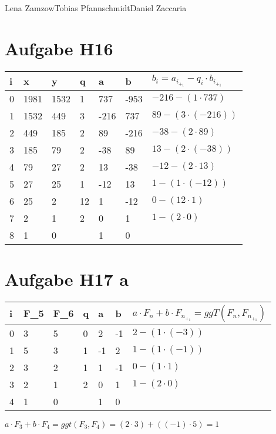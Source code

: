 \documentclass[11pt,a4paper]{article}
\begin{document}
                {Lena Zamzow}{Tobias Pfannschmidt}{Daniel Zaccaria}{}{}


\section*{Aufgabe H16}

\begin{center}
	\begin{tabular}{ | l | l | l | l | l | l | l|}
		\hline
		i&x&y&q&a&b&$b_i=a_i_+_1-q_i \cdot b_i_+_1 $ \\ \hline		
		0&1981&1532&1&737&-953&$-216-(1 \cdot 737 )$ \\ \hline
		1&1532&449&3&-216&737&$89-(3 \cdot (-216) )$ \\ \hline
		2&449&185&2&89&-216&$-38-(2 \cdot 89)$\\ \hline
		3&185&79&2&-38&89&$13-(2 \cdot (-38))$ \\ \hline
		4&79&27&2&13&-38&$-12-(2 \cdot 13)$ \\ \hline
		5&27&25&1&-12&13&$1-(1\cdot (-12))$ \\ \hline
		6&25&2&12&1&-12&$0-(12 \cdot 1)$\\ \hline
		7&2&1&2&0&1&$1-(2 \cdot 0)$\\ \hline
		8&1&0&&1&0&\\ \hline
		\hline	
	\end{tabular}
\end{center}

\section*{Aufgabe H17 a}

\begin{center}
	\begin{tabular}{ | l | l | l | l | l | l | l|}
		\hline
		i&F_5&F_6&q&a&b&$a\cdot F_n + b \cdot F_n_+_1 = ggT(F_n,F_n_+_1)$ \\ \hline		
		0&3&5&0&2&-1&$2-(1 \cdot (-3) )$ \\ \hline
		1&5&3&1&-1&2&$1-(1 \cdot (-1))$ \\ \hline
		2&3&2&1&1&-1&$0-(1 \cdot 1)$ \\ \hline
		3&2&1&2&0&1&$1-(2\cdot 0)$ \\ \hline
		4&1&0&&1&0&\\ \hline
		\hline	
	\end{tabular}
\end{center}
$a\cdot F_3 +b \cdot F_4 = ggt(F_3,F_4)=(2\cdot 3)+((-1)\cdot5)=1$
\end{document}
